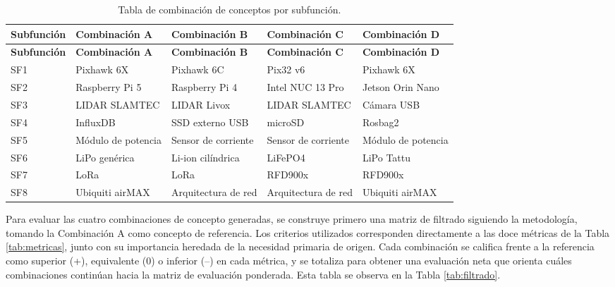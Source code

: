 \begin{longtable}{|p{2.2cm}|p{3.3cm}|p{3.3cm}|p{3.3cm}|p{3.3cm}|}
\caption{Tabla de combinación de conceptos por subfunción.}
\label{tab:combinacion_conceptos} \\
\hline
\textbf{Subfunción} & \textbf{Combinación A} & \textbf{Combinación B} & \textbf{Combinación C} & \textbf{Combinación D} \\
\hline
\endfirsthead
\hline
\textbf{Subfunción} & \textbf{Combinación A} & \textbf{Combinación B} & \textbf{Combinación C} & \textbf{Combinación D} \\
\hline
\endhead

SF1 & Pixhawk 6X & Pixhawk 6C & Pix32 v6 & Pixhawk 6X \\
\hline
SF2 & Raspberry Pi 5 & Raspberry Pi 4 & Intel NUC 13 Pro & Jetson Orin Nano \\
\hline
SF3 & LIDAR SLAMTEC & LIDAR Livox & LIDAR SLAMTEC & Cámara USB \\
\hline
SF4 & InfluxDB & SSD externo USB & microSD & Rosbag2 \\
\hline
SF5 & Módulo de potencia & Sensor de corriente & Sensor de corriente & Módulo de potencia \\
\hline
SF6 & LiPo genérica & Li-ion cilíndrica & LiFePO4 & LiPo Tattu \\
\hline
SF7 & LoRa & LoRa & RFD900x & RFD900x \\
\hline
SF8 & Ubiquiti airMAX & Arquitectura de red & Arquitectura de red & Ubiquiti airMAX \\
\hline
\end{longtable}

Para evaluar las cuatro combinaciones de concepto generadas, se construye 
primero una matriz de filtrado siguiendo la metodología, tomando la Combinación A como concepto 
de referencia. Los criterios utilizados corresponden directamente a las doce métricas de la 
Tabla \ref{tab:metricas}, junto con su importancia heredada de la necesidad primaria de origen. Cada combinación 
se califica frente a la referencia como superior (+), equivalente (0) o inferior (--) en cada 
métrica, y se totaliza para obtener una evaluación neta que orienta cuáles combinaciones continúan 
hacia la matriz de evaluación ponderada. Esta tabla se observa en la Tabla \ref{tab:filtrado}.

\newpage

